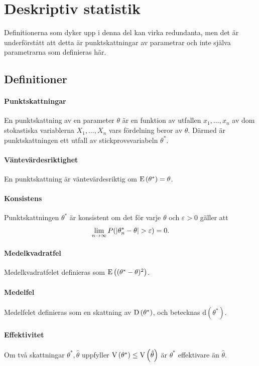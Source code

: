 \section{Deskriptiv statistik}
Definitionerna som dyker upp i denna del kan virka redundanta, men det är underförstått att detta är punktskattningar av parametrar och inte själva parametrarna som definieras här.

\subsection{Definitioner}

\paragraph{Punktskattningar}
En punktskattning av en parameter $\theta$ är en funktion av utfallen $x_1, \dots, x_n$ av dom stokastiska variablerna $X_1, \dots, X_n$ vars fördelning beror av $\theta$. Därmed är punktskattningen ett utfall av stickprovsvariabeln $\theta^*$.

\paragraph{Väntevärdesriktighet}
En punktskattning är väntevärdesriktig om $\text{E}\left(\theta^*\right) = \theta$.

\paragraph{Konsistens}
Punktskattningen $\theta^*$ är konsistent om det för varje $\theta$ och $\varepsilon > 0$ gäller att
\begin{align*}
	\lim\limits_{n\to\infty}P(\abs{\theta_{n}^* - \theta} > \varepsilon) = 0.
\end{align*}

\paragraph{Medelkvadratfel}
Medelkvadratfelet definieras som $\text{E}\left((\theta^* - \theta)^2\right)$.

\paragraph{Medelfel}
Medelfelet definieras som en skattning av $\text{D}\left(\theta^*\right)$, och betecknas $\text{d}(\theta^*)$.

\paragraph{Effektivitet}
Om två skattningar $\theta^*, \hat{\theta}$ uppfyller $\text{V}\left(\theta^*\right)\leq\text{V}\left(\hat{\theta}\right)$ är $\theta^*$ effektivare än $\hat{\theta}$.

